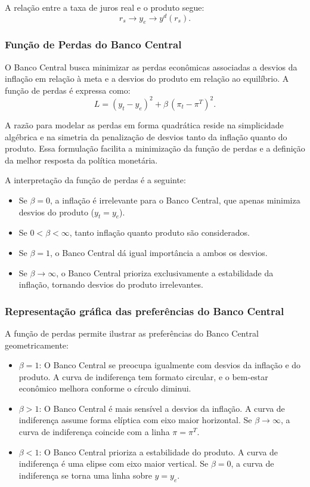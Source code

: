\documentclass[a4paper,12pt]{article}[abntex2]
\begin{document}
A relação entre a taxa de juros real e o produto segue:
\[
r_s \longrightarrow y_e \longrightarrow y^d(r_s).
\]

\subsubsection{\textbf{Função de Perdas do Banco Central}}

O Banco Central busca minimizar as perdas econômicas associadas a desvios da inflação em relação à meta e a desvios do produto em relação ao equilíbrio. A função de perdas é expressa como:
\[
L = (y_t - y_e)^2 + \beta \, (\pi_t - \pi^T)^2.
\]

A razão para modelar as perdas em forma quadrática reside na simplicidade algébrica e na simetria da penalização de desvios tanto da inflação quanto do produto. Essa formulação facilita a minimização da função de perdas e a definição da melhor resposta da política monetária.

A interpretação da função de perdas é a seguinte:
\begin{itemize}
    \item Se \(\beta = 0\), a inflação é irrelevante para o Banco Central, que apenas minimiza desvios do produto (\(y_t = y_e\)).
    \item Se \(0 < \beta < \infty\), tanto inflação quanto produto são considerados.
    \item Se \(\beta = 1\), o Banco Central dá igual importância a ambos os desvios.
    \item Se \(\beta \to \infty\), o Banco Central prioriza exclusivamente a estabilidade da inflação, tornando desvios do produto irrelevantes.
\end{itemize}

\subsubsection{\textbf{Representação gráfica das preferências do Banco Central}}

A função de perdas permite ilustrar as preferências do Banco Central geometricamente:
\begin{itemize}
    \item \(\beta = 1\): O Banco Central se preocupa igualmente com desvios da inflação e do produto. A curva de indiferença tem formato circular, e o bem-estar econômico melhora conforme o círculo diminui.
    \item \(\beta > 1\): O Banco Central é mais sensível a desvios da inflação. A curva de indiferença assume forma elíptica com eixo maior horizontal. Se \(\beta \to \infty\), a curva de indiferença coincide com a linha \(\pi = \pi^T\).
    \item \(\beta < 1\): O Banco Central prioriza a estabilidade do produto. A curva de indiferença é uma elipse com eixo maior vertical. Se \(\beta = 0\), a curva de indiferença se torna uma linha sobre \(y = y_e\).
\end{itemize}
\end{document}
